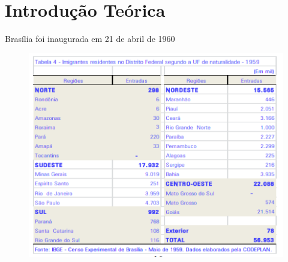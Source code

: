 \chapter{Introdução Teórica}

Brasília foi inaugurada em 21 de abril de 1960


\begin{figure}
    \centering
    \includegraphics[width=0.7\linewidth]{fig/imigrantes-1959}
    \caption{}
    \label{fig:imigrantes-1959}
\end{figure}
